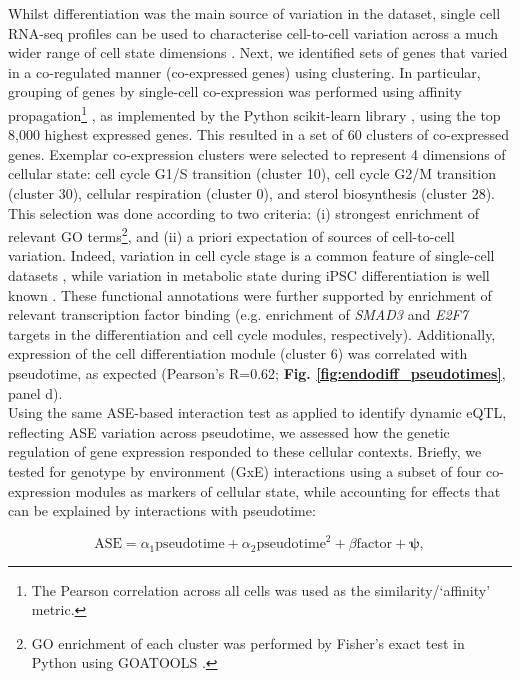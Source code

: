 Whilst differentiation was the main source of variation in the dataset, single cell RNA-seq profiles can be used to characterise cell-to-cell variation across a much wider range of cell state dimensions \cite{buettner2015computational, buettner2017f, fan2016characterizing}. 
Next, we identified sets of genes that varied in a co-regulated manner (co-expressed genes) using clustering.
In particular, grouping of genes by single-cell co-expression was performed using affinity propagation\footnote{The Pearson correlation across all cells was used as the similarity/‘affinity’ metric.} \cite{frey2007clustering}, as implemented by the Python scikit-learn library \cite{garreta2013learning}, using the top 8,000 highest expressed genes.
This resulted in a set of 60 clusters of co-expressed genes. 
Exemplar co-expression clusters were selected to represent 4 dimensions of
cellular state: cell cycle G1/S transition (cluster
10), cell cycle G2/M transition (cluster 30), cellular respiration (cluster 0), and
sterol biosynthesis (cluster 28). 
This selection was done according to two criteria: (i) strongest enrichment of relevant GO terms\footnote{GO enrichment of each cluster was performed by Fisher’s exact test in Python using GOATOOLS \cite{klopfenstein2018goatools}.}, and (ii) a priori expectation of sources of cell-to-cell variation. 
Indeed, variation in cell cycle stage is a common feature of single-cell datasets \cite{buettner2015computational}, while variation in metabolic state during iPSC differentiation is well known \cite{xu2013mitochondrial}.
These functional annotations were further supported by enrichment of relevant transcription factor binding (e.g. enrichment of \textit{SMAD3} and \textit{E2F7} targets in the differentiation and cell cycle modules, respectively). 
Additionally, expression of the cell differentiation module (cluster 6) was correlated with pseudotime, as expected (Pearson's R=0.62; \textbf{Fig. \ref{fig:endodiff_pseudotimes}}, panel d).\\

Using the same ASE-based interaction test as applied to identify dynamic eQTL, reflecting ASE variation across pseudotime, we assessed how the genetic regulation of gene expression responded to these cellular contexts. 
Briefly, we tested for genotype by environment (GxE) interactions using a subset of four co-expression modules as markers of cellular state, while accounting for effects that can be explained by interactions with pseudotime:

\begin{equation}\label{eq:endodiff_ase_gxe}
    \mathrm{ASE} = \alpha_1 \mathrm{pseudotime} + \alpha_2 \mathrm{pseudotime}^2 + \beta\mathrm{factor} + \boldsymbol{\psi},
\end{equation}

